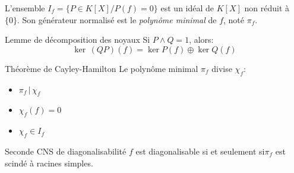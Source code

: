 \documentclass[french, a4paper, 11pt, twocolumn]{article}
\newcommand{\ssi}{si et seulement si\xspace}		%
\newcommand{\co}{\left[}         %
\newcommand{\cf}{\right]}        %
\newcommand{\cof}[1]{\co #1 \cf} %
\begin{document}
\begin{definition}
  L'ensemble \(I_{f}=\lbrace P\in K\cof{X} \slash P(f)=0\rbrace\) est un idéal de \(K\cof{X}\) non réduit à \(\lbrace 0 \rbrace\). Son générateur normalisé est le \emph{polynôme minimal} de \(f\), noté \(\pi_{f}\).
\end{definition}

\begin{theoreme}{Lemme de décomposition des noyaux}
  Si \(P\wedge Q = 1\), alors:
  \[\ker\, (QP)(f) = \ker P(f)\oplus \ker Q(f)\]
\end{theoreme}

\begin{theoreme}{Théorème de Cayley-Hamilton}
  Le polynôme minimal \(\pi_{f}\) divise \(\chi_{f}\):
  \begin{itemize}[label=\(\bullet\)]
    \item \(\pi_{f}\,|\,\chi_{f}\)
    \item \(\chi_{f}(f) = 0\)
    \item \(\chi_{f} \in I_{f}\)
  \end{itemize}
\end{theoreme}

\begin{theoreme}{Seconde CNS de diagonalisabilité}
  \(f\) est diagonalisable \ssi \(\pi_{f}\) est scindé à racines simples.
\end{theoreme}
\end{document}
